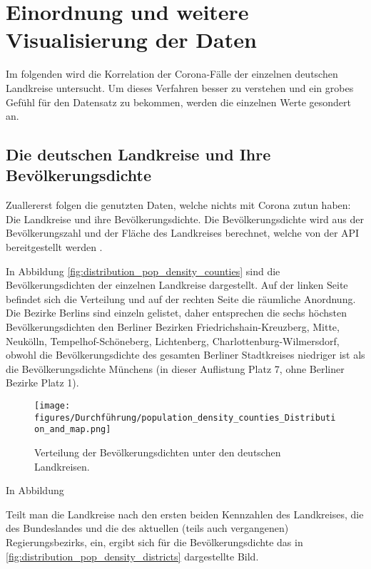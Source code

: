 
\section{Einordnung und weitere Visualisierung der Daten}
Im folgenden wird die Korrelation der Corona-Fälle der einzelnen deutschen Landkreise untersucht. Um dieses Verfahren besser zu verstehen und ein grobes Gefühl für den Datensatz zu bekommen, werden die einzelnen Werte gesondert an.

\subsection{Die deutschen Landkreise und Ihre Bevölkerungsdichte}
Zuallererst folgen die genutzten Daten, welche nichts mit Corona zutun haben: Die Landkreise und ihre Bevölkerungsdichte. Die Bevölkerungsdichte wird aus der Bevölkerungszahl und der Fläche des Landkreises berechnet, welche von der API bereitgestellt werden .

In Abbildung \autoref{fig:distribution_pop_density_counties} sind die Bevölkerungsdichten der einzelnen Landkreise dargestellt. Auf der linken Seite befindet sich die Verteilung und auf der rechten Seite die räumliche Anordnung.
Die Bezirke Berlins sind einzeln gelistet, daher entsprechen die sechs höchsten Bevölkerungsdichten den Berliner Bezirken  Friedrichshain-Kreuzberg, Mitte, Neukölln, Tempelhof-Schöneberg, Lichtenberg, Charlottenburg-Wilmersdorf, obwohl die Bevölkerungsdichte des gesamten Berliner Stadtkreises niedriger ist als die Bevölkerungsdichte Münchens (in dieser Auflistung Platz 7, ohne Berliner Bezirke Platz 1).

\begin{figure}[H]
    \centering
    \texttt{[image: figures/Durchführung/population\_density\_counties\_Distribution\_and\_map.png]}
    \caption{Verteilung der Bevölkerungsdichten unter den deutschen Landkreisen.}
    \label{fig:distribution_pop_density_counties}
\end{figure}

In Abbildung 


Teilt man die Landkreise nach den ersten beiden Kennzahlen des Landkreises, die des Bundeslandes und die des aktuellen (teils auch vergangenen) Regierungsbezirks, ein, ergibt sich für die Bevölkerungsdichte das in \autoref{fig:distribution_pop_density_districts} dargestellte Bild.

